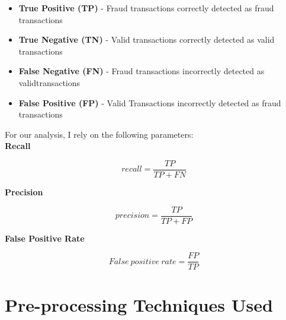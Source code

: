 \documentclass[conference]{IEEEtran}
\begin{document}

\begin{itemize}
\item \textbf{True Positive (TP)} - Fraud transactions correctly detected as fraud transactions
\item \textbf{True Negative (TN)} - Valid transactions correctly detected as valid transactions
\item \textbf{False Negative (FN)} - Fraud transactions incorrectly detected as validtransactions
\item \textbf{False Positive (FP)} - Valid Transactions incorrectly detected as fraud transactions
\end{itemize}

For our analysis, I rely on the following parameters:\\

\textbf{Recall}

\[recall = \frac{TP}{TP+FN}\]

\textbf{Precision}

\[precision = \frac{TP}{TP+FP}\]

\textbf{False Positive Rate}

\[False\ positive\ rate = \frac{FP}{TP}\]

\hfill

\section{Pre-processing Techniques Used}
\end{document}
